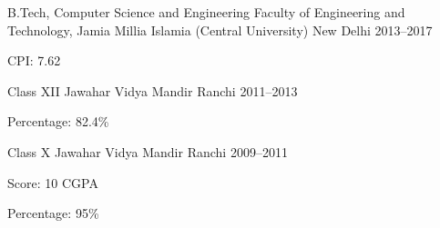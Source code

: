 
\begin{cventries}

\cventry%
  {B.Tech, Computer Science and Engineering} %
  {Faculty of Engineering and Technology, Jamia Millia Islamia (Central
   University)} %
  {New Delhi} %
  {2013--2017} %
  {%
    \begin{cvitems}%
      \item{CPI: 7.62}
    \end{cvitems}
  }

\cventry%
  {Class XII} %
  {Jawahar Vidya Mandir} %
  {Ranchi} %
  {2011--2013} %
  {%
    \begin{cvitems} %
      \item{Percentage: 82.4\%}
    \end{cvitems}
  }

\cventry%
  {Class X} %
  {Jawahar Vidya Mandir} %
  {Ranchi} %
  {2009--2011} %
  {%
    \begin{cvitems} %
      \item{Score: 10 CGPA}
      \item{Percentage: 95\%}
    \end{cvitems}
  }

\end{cventries}
